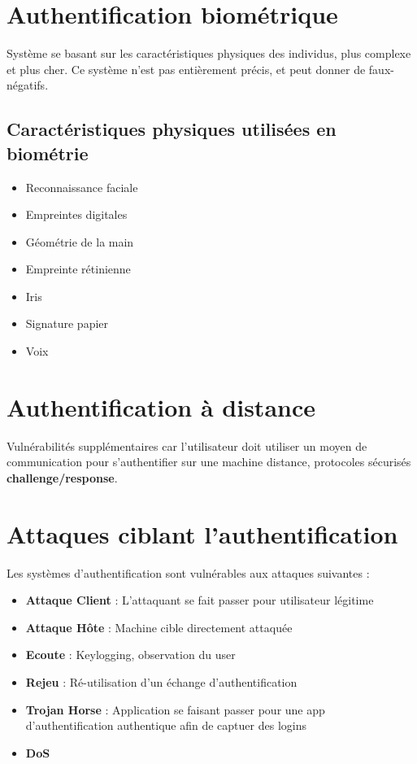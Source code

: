 \documentclass{report}
\begin{document}
	\section{Authentification biométrique}

		Système se basant sur les caractéristiques physiques des individus, plus complexe et plus cher. Ce système n'est pas entièrement précis, et peut donner de faux-négatifs.\\

		\subsection{Caractéristiques physiques utilisées en biométrie}

			\begin{itemize}
				\item Reconnaissance faciale
				\item Empreintes digitales
				\item Géométrie de la main
				\item Empreinte rétinienne
				\item Iris
				\item Signature papier
				\item Voix\\
			\end{itemize}

	\section{Authentification à distance}

		Vulnérabilités supplémentaires car l'utilisateur doit utiliser un moyen de communication pour s'authentifier sur une machine distance, protocoles sécurisés \textbf{challenge/response}.\\

	\section{Attaques ciblant l'authentification}

		Les systèmes d'authentification sont vulnérables aux attaques suivantes : \\

		\begin{itemize}
			\item \textbf{Attaque Client} : L'attaquant se fait passer pour utilisateur légitime
			\item \textbf{Attaque Hôte} : Machine cible directement attaquée
			\item \textbf{Ecoute} : Keylogging, observation du user
			\item \textbf{Rejeu} : Ré-utilisation d'un échange d'authentification
			\item \textbf{Trojan Horse} : Application se faisant passer pour une app d'authentification authentique afin de captuer des logins
			\item \textbf{DoS}\\
		\end{itemize}
	
\end{document}
